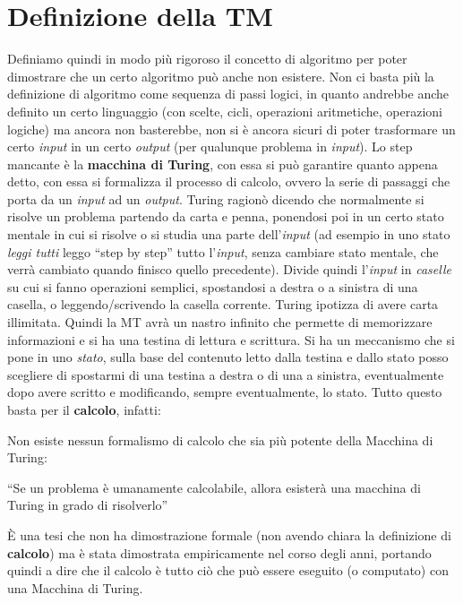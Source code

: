 \section{Definizione della TM}
Definiamo quindi in modo più rigoroso il concetto di algoritmo per poter
dimostrare che un certo algoritmo può anche non esistere. Non ci basta più la
definizione di algoritmo come sequenza di passi logici, in quanto andrebbe anche
definito un certo linguaggio (con scelte, cicli, operazioni aritmetiche,
operazioni logiche) ma ancora non basterebbe, non si è ancora sicuri di poter
trasformare un certo \textit{input} in un certo \textit{output} (per qualunque problema in
\textit{input}). Lo step mancante è la \textbf{macchina di Turing}, con essa si può
garantire quanto appena detto, con essa si formalizza il processo di calcolo,
ovvero la serie di passaggi che porta da un \textit{input} ad un \textit{output}. Turing ragionò
dicendo che normalmente si risolve un problema partendo da carta e penna,
ponendosi poi in un certo stato mentale in cui si risolve o si studia una parte
dell'\textit{input} (ad esempio in uno stato \textit{leggi tutti} leggo ``step by step''
tutto l'\textit{input}, senza cambiare stato mentale, che verrà cambiato quando finisco
quello precedente). Divide quindi l'\textit{input} in \textit{caselle} su cui si fanno
operazioni semplici, spostandosi a destra o a sinistra di una casella, o
leggendo/scrivendo la casella corrente. Turing ipotizza di avere carta
illimitata. Quindi la MT avrà un nastro infinito che permette di memorizzare
informazioni e si ha una testina di lettura e scrittura. Si ha un meccanismo che
si pone in uno \textit{stato}, sulla base del contenuto letto dalla testina e
dallo stato posso scegliere di spostarmi di una testina a destra o di una a
sinistra, eventualmente dopo avere scritto e modificando, sempre eventualmente,
lo stato. Tutto questo basta per il \textbf{calcolo}, infatti:
\begin{definizione}
  Non esiste nessun formalismo di calcolo che sia più
  potente della Macchina di Turing:
  \begin{center}
   ``Se un problema è umanamente calcolabile, allora esisterà una macchina di
    Turing in grado di risolverlo''
  \end{center}
  È una tesi che non ha dimostrazione formale (non avendo chiara la definizione
  di \textbf{calcolo}) ma è stata dimostrata
  empiricamente nel corso degli anni, portando quindi a dire che il calcolo è tutto
  ciò che può essere eseguito (o computato) con una Macchina di Turing.\\
  
\end{definizione}
